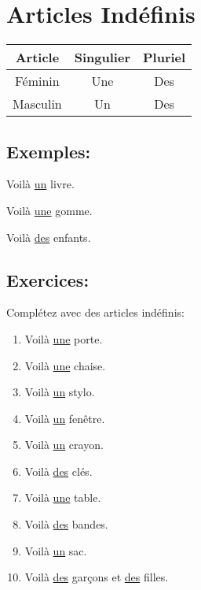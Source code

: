 \section{Articles Indéfinis}

\begin{tabular}{|c|c|c|}
    \hline
    Article & Singulier & Pluriel \\
    \hline
    Féminin & Une & Des \\
    \hline
    Masculin & Un & Des \\
    \hline
\end{tabular}

\subsection{Exemples:}

Voilà \underline{un} livre.

Voilà \underline{une} gomme.

Voilà \underline{des} enfants.

\subsection{Exercices:}

Complétez avec des articles indéfinis:

\begin{enumerate}
    \item Voilà \underline{une} porte.
    \item Voilà \underline{une} chaise.
    \item Voilà \underline{un} stylo.
    \item Voilà \underline{un} fenêtre.
    \item Voilà \underline{un} crayon.
    \item Voilà \underline{des} clés.
    \item Voilà \underline{une} table.
    \item Voilà \underline{des} bandes.
    \item Voilà \underline{un} sac.
    \item Voilà \underline{des} garçons et \underline{des} filles.
\end{enumerate}